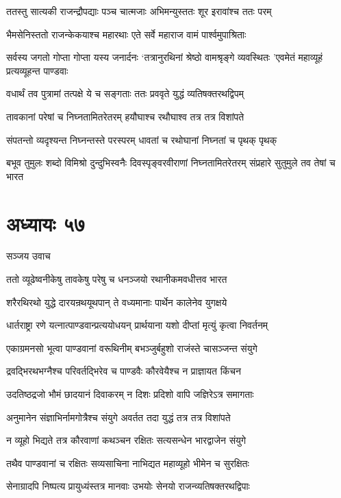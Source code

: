 \twolineshloka
{ततस्तु सात्यकी राजन्द्रौपद्याः पञ्च चात्मजाः}
{अभिमन्युस्ततः शूर इरावांश्च ततः परम्}


\twolineshloka
{भैमसेनिस्ततो राजन्केकयाश्च महारथाः}
{एते सर्वे महाराज वामं पार्श्वमुपाश्रिताः}


\threelineshloka
{सर्वस्य जगतो गोप्ता गोप्ता यस्य जनार्दनः}
{`तत्रानुरथिनां श्रेष्ठो वामश्रृङ्गे व्यवस्थितः}
{'एवमेतं महाव्यूहं प्रत्यव्यूहन्त पाण्डवाः}


\twolineshloka
{वधार्थं तव पुत्रामां तत्पक्षे ये च सङ्गताः}
{ततः प्रववृते युद्धं व्यतिषक्तरथद्विपम्}


\twolineshloka
{तावकानां परेषां च निघ्नतामितरेतरम्}
{हयौघाश्च रथौघाश्व तत्र तत्र विशांपते}


\twolineshloka
{संपतन्तो व्यदृश्यन्त निघ्नन्तस्ते परस्परम्}
{धावतां च रथोघानां निघ्नतां च पृथक् पृथक्}


\threelineshloka
{बभूव तुमुलः शब्दो विमिश्रो दुन्दुभिस्वनैः}
{दिवस्पृङ्वरवीराणां निघ्नतामितरेतरम्}
{संप्रहारे सुतुमुले तव तेषां च भारत}


\chapter{अध्यायः ५७}
\twolineshloka
{सञ्जय उवाच}
{}


\twolineshloka
{ततो व्यूढेष्वनीकेषु तावकेषु परेषु च}
{धनञ्जयो रथानीकमवधीत्तव भारत}


\twolineshloka
{शरैरथिरथो युद्धे दारयन्रथयूथपान्}
{ते वध्यमानाः पार्थेन कालेनेव युगक्षये}


\twolineshloka
{धार्तराष्ट्रा रणे यत्नात्पाण्डवान्प्रत्ययोधयन्}
{प्रार्थयाना यशो दीप्तां मृत्युं कृत्वा निवर्तनम्}


\twolineshloka
{एकाग्रमनसो भूत्वा पाण्डवानां वरूथिनीम्}
{बभञ्जुर्बहुशो राजंस्ते चासञ्जन्त संयुगे}


\twolineshloka
{द्रवद्भिरथभग्नैश्च परिवर्तद्भिरेव च}
{पाण्डवैः कौरवेयैश्च न प्राज्ञायत किंचन}


\twolineshloka
{उदतिष्ठद्रजो भौमं छादयानं दिवाकरम्}
{न दिशः प्रदिशो वापि जज्ञिरेऽत्र समागताः}


\twolineshloka
{अनुमानेन संज्ञाभिर्नामगोत्रैश्च संयुगे}
{अवर्तत तदा युद्धं तत्र तत्र विशांपते}


\twolineshloka
{न व्यूहो भिद्यते तत्र कौरवाणां कथञ्चन}
{रक्षितः सत्यसन्धेन भारद्वाजेन संयुगे}


\twolineshloka
{तथैव पाण्डवानां च रक्षितः सव्यसाचिना}
{नाभिद्यत महाव्यूहो भीमेन च सुरक्षितः}


\twolineshloka
{सेनाग्रादपि निष्पत्य प्रायुध्यंस्तत्र मानवाः}
{उभयोः सेनयो राजन्व्यतिषक्तरथद्विपाः}



